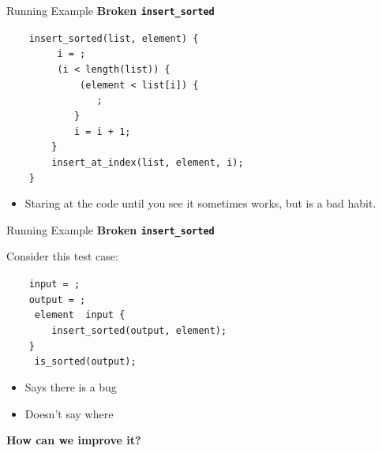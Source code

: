 \documentclass[xcolor=dvipsnames]{beamer}
\begin{document}
\begin{frame}{Running Example}
	\textbf{Broken \texttt{insert\_sorted}}

	\linegap
		\texttt{~~~~insert\_sorted(list,~element)~\{} \\
			\texttt{~~~~~~~~~i~=~;} \\
		\texttt{~~~~~~~~~(i~<~length(list))~\{} \\
		\texttt{~~~~~~~~~~~~~(element~<~list[i])~\{} \\
		\texttt{~~~~~~~~~~~~~~~~;} \\
		\texttt{~~~~~~~~~~~~\}} \\
		\texttt{~~~~~~~~~~~~i = i + 1;} \\
		\texttt{~~~~~~~~\}} \\
		\texttt{~~~~~~~~insert\_at\_index(list,~element,~i);} \\
		\texttt{~~~~\}} \\
	\pause
	\linegap
	\begin{itemize}
		\item Staring at the code until you see it sometimes works, but is a bad habit.
	\end{itemize}
\end{frame}

\begin{frame}{Running Example}
	\textbf{Broken \texttt{insert\_sorted}}

	\linegap
	Consider this test case:

	\linegap
		\texttt{~~~~input~=~;} \\
		\texttt{~~~~output~=~;} \\
		\texttt{~~~~~element~~input~\{} \\
		\texttt{~~~~~~~~insert\_sorted(output,~element);} \\
		\texttt{~~~~\}} \\
		\texttt{~~~~~is\_sorted(output);~} \\
	\linegap

	\pause
	\begin{itemize}
		\item Says there is a bug
		\item Doesn't say where
	\end{itemize}
	\pause
	{\bf How can we improve it?}
\end{frame}
\end{document}
